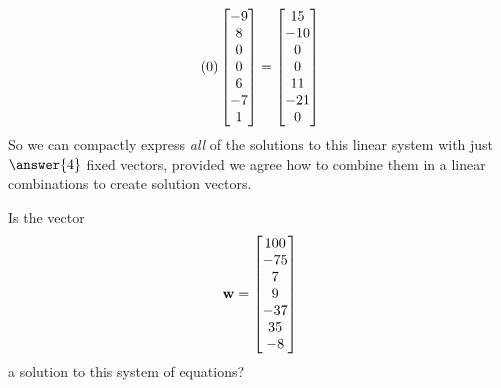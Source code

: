 \documentclass{ximera}
\begin{document}
\begin{example}
\begin{align*}
    (0)\begin{bmatrix}-9\\ 8\\ 0\\ 0\\ 6\\ -7\\ 1\end{bmatrix}
    =
    \begin{bmatrix}15\\ -10\\ 0\\ 0\\ 11\\ -21\\ 0\end{bmatrix}
  \end{align*}
  So we can compactly express \textit{all} of the solutions to this
  linear system with just $\answer{4}$ fixed vectors, provided we agree
  how to combine them in a linear combinations to create solution
  vectors.

  \begin{question}
    Is the vector 
    \[
      \mathbf{w}=\begin{bmatrix}100\\-75\\7\\9\\-37\\35\\-8\end{bmatrix}
    \]
    a solution to this system of equations?

    \begin{multipleChoice}
    \end{multipleChoice}


\end{question}
\end{example}
\end{document}
